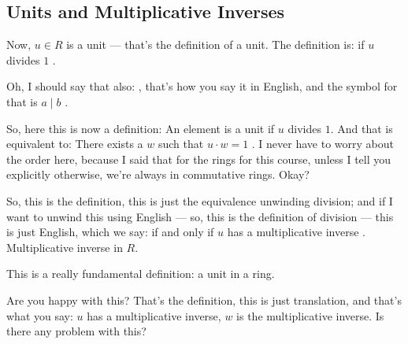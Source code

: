 \subsection{Units and Multiplicative Inverses}

\begin{speech}[00:24:29 - 00:26:22]
Now, $u \in R$ is a unit  --- that's the definition of a unit. The definition is: if $u$ divides $1$ .

Oh, I should say that also: , that's how you say it in English, and the symbol for that is $a \mid b$ .

So, here this is now a definition: An element is a unit if $u$ divides $1$. And that is equivalent to: There exists a $w$ such that $u \cdot w = 1$ . I never have to worry about the order here, because I said that for the rings for this course, unless I tell you explicitly otherwise, we're always in commutative rings. Okay?

So, this is the definition, this is just the equivalence unwinding division; and if I want to unwind this using English --- so, this is the definition of division  --- this is just English, which we say: if and only if $u$ has a multiplicative inverse . Multiplicative inverse in $R$.

This is a really fundamental definition: a unit in a ring.

Are you happy with this? That's the definition, this is just translation, and that's what you say: $u$ has a multiplicative inverse, $w$ is the multiplicative inverse. Is there any problem with this?
\end{speech}

